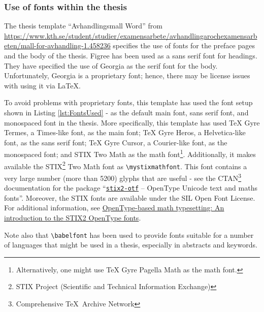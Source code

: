 \documentclass[12pt, twoside]{article}
\begin{document}
\subsubsection{Use of fonts within the thesis}
\label{sec:cycle3useOfFontsWithinThesis}

The thesis template \enquote{\foreignlanguage{swedish}{Avhandlingsmall Word}} from
\url{https://www.kth.se/student/studier/examensarbete/avhandlingarochexamensarbeten/mall-for-avhandling-1.458236} specifies the use of fonts for the preface pages and the body of the thesis. Figree has been used as a sans serif font for headings. They have specified the use of Georgia as the serif font for the body. Unfortunately, Georgia is a proprietary font; hence, there may be license issues with using it via \LaTeX.

To avoid problems with proprietary fonts, this template has used the font setup shown in Listing \ref{lst:FontsUsed} - as the default main font, sans serif font, and monospaced font in the thesis. More specifically, this template has used TeX Gyre Termes, a Times-like font, as the main font; TeX Gyre Heros, a Helvetica-like font, as the sans serif font;  TeX Gyre Cursor, a Courier-like font, as the monospaced font; and 
STIX Two Math as the math font\footnote{Alternatively, one might use TeX Gyre Pagella Math as the math font.}. Additionally, it makes available the STIX\footnote{STIX Project (Scientific and Technical Information Exchange)} Two Math font as \texttt{\textbackslash mystixmathfont}. This font contains a very large number (more than \num{5200}) glyphs that are useful - see the CTAN\footnote{Comprehensive \TeX\  Archive Network} documentation for the package \enquote{\href{https://ctan.org/pkg/stix2-otf/?lang=en}{\texttt{stix2-otf}} – OpenType Unicode text and maths fonts}. Moreover, the STIX fonts are available under the SIL Open Font License. For additional information, see \href{https://www.overleaf.com/learn/latex/Articles/OpenType-based_math_typesetting%3A_An_introduction_to_the_STIX2_OpenType_fonts}{OpenType-based math typesetting: An introduction to the STIX2 OpenType fonts}.

Note also that \texttt{\textbackslash babelfont} has been used to provide fonts suitable for a number of languages that might be used in a thesis, especially in abstracts and keywords. 
\end{document}
